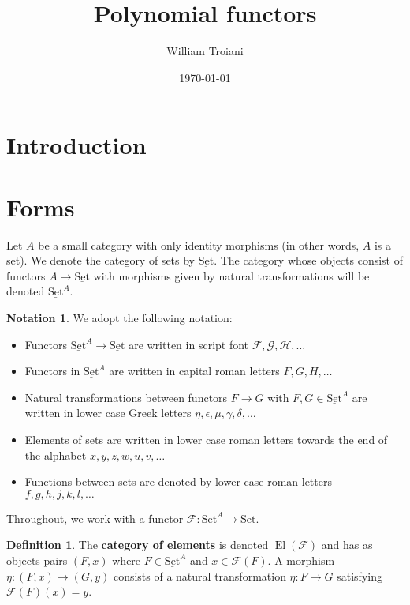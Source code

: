 \documentclass[12pt]{article}
\title{Polynomial functors}
\author{William Troiani}
\date{\today}
\theoremstyle{plain}
\theoremstyle{definition}
\newtheorem{defn}[thm]{Definition} %
\newtheorem{notation}[thm]{Notation}
\newcommand{\scr}[1]{\mathscr{#1}}
\newcommand{\lto}{\longrightarrow}
\newcommand{\set}{\operatorname{\underline{Set}}}
\begin{document}
	\maketitle
	\tableofcontents
	
	\section{Introduction}
	
	
	
	
	
	\section{Forms}
	Let $A$ be a small category with only identity morphisms (in other words, $A$ is a set). We denote the category of sets by $\set$. The category whose objects consist of functors $A \lto \set$ with morphisms given by natural transformations will be denoted $\set^A$.
	\begin{notation}
		We adopt the following notation:
		\begin{itemize}
			\item Functors $\set^A \lto \set$ are written in script font $\scr{F}, \scr{G}, \scr{H},\ldots$
			\item Functors in $\set^A$ are written in capital roman letters $F, G, H, \ldots$
			\item Natural transformations between functors $F \lto G$ with $F,G \in \set^A$ are written in lower case Greek letters $\eta, \epsilon, \mu, \gamma, \delta, \ldots$
			\item Elements of sets are written in lower case roman letters towards the end of the alphabet $x, y, z, w, u, v, \ldots$
			\item Functions between sets are denoted by lower case roman letters $f, g, h, j, k, l, \ldots$
			\end{itemize}
		\end{notation}
	Throughout, we work with a functor $\scr{F}: \set^A \lto \set$.
	\begin{defn}
		The \textbf{category of elements} is denoted $\operatorname{El}(\scr{F})$ and has as objects pairs $(F, x)$ where $F \in \set^A$ and $x \in \scr{F}(F)$. A morphism $\eta: (F,x) \lto (G,y)$ consists of a natural transformation $\eta: F \lto G$ satisfying $\scr{F}(F)(x) = y$.
	\end{defn}
\end{document}
